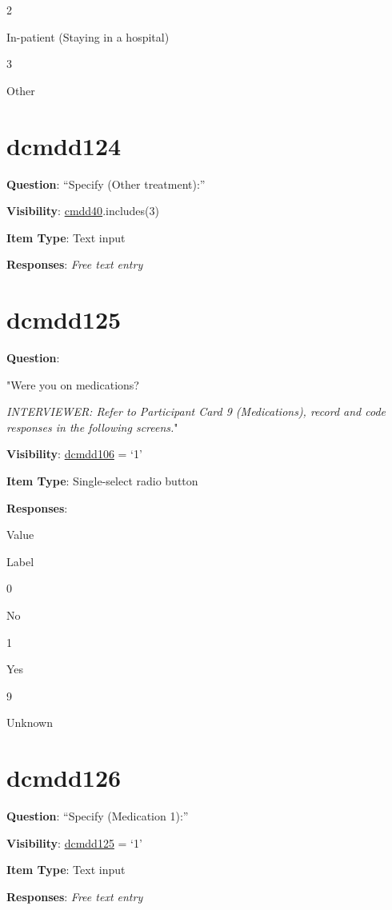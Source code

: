 \documentclass[]{book}
\begin{document}
2

In-patient (Staying in a hospital)

3

Other

\hypertarget{dcmdd124}{%
\section{dcmdd124}\label{dcmdd124}}

\textbf{Question}: ``Specify (Other treatment):''

\textbf{Visibility}: \protect\hyperlink{cmdd40}{cmdd40}.includes(3)

\textbf{Item Type}: Text input

\textbf{Responses}: \emph{Free text entry}

\hypertarget{dcmdd125}{%
\section{dcmdd125}\label{dcmdd125}}

\textbf{Question}:

"Were you on medications?

\emph{INTERVIEWER: Refer to Participant Card 9 (Medications), record and code responses in the following screens.}"

\textbf{Visibility}: \protect\hyperlink{dcmdd106}{dcmdd106} = `1'

\textbf{Item Type}: Single-select radio button

\textbf{Responses}:

Value

Label

0

No

1

Yes

9

Unknown

\hypertarget{dcmdd126}{%
\section{dcmdd126}\label{dcmdd126}}

\textbf{Question}: ``Specify (Medication 1):''

\textbf{Visibility}: \protect\hyperlink{dcmdd125}{dcmdd125} = `1'

\textbf{Item Type}: Text input

\textbf{Responses}: \emph{Free text entry}
\end{document}
